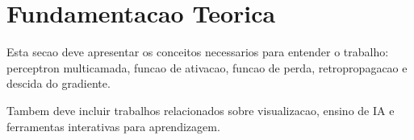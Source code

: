 \section{Fundamentacao Teorica}

Esta secao deve apresentar os conceitos necessarios para entender o trabalho:
perceptron multicamada, funcao de ativacao, funcao de perda, retropropagacao e
descida do gradiente.

Tambem deve incluir trabalhos relacionados sobre visualizacao, ensino de IA e
ferramentas interativas para aprendizagem.


